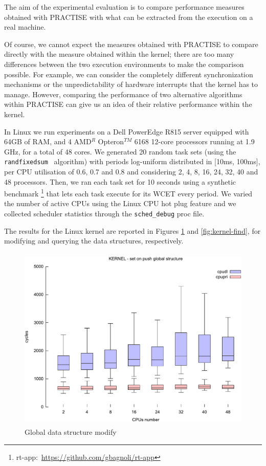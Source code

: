 The aim of the experimental evaluation is to compare performance measures obtained with
PRACTISE with what can be extracted from the execution on a real machine.

Of course, we cannot expect the measures obtained with PRACTISE to compare directly with the
measure obtained within the kernel; there are too many differences between the two execution
environments to make the comparison possible. For example, we can consider the completely different
synchronization mechanisms or the unpredictability of hardware interrupts that the kernel
has to manage. However, comparing the performance of two alternative algorithms
within PRACTISE can give us an idea of their relative performance within the kernel.

In Linux we run experiments on a Dell PowerEdge R815 server equipped with 64GB of RAM, and
4 AMD$^{R}$ Opteron$^{TM}$ 6168 12-core processors running at 1.9 GHz, for a total of 48 cores.
We generated 20 random task sets (using the \texttt{randfixedsum}~\cite{Emberson10-WATERS} algorithm) with
periods log-uniform distributed in [10ms, 100ms], per CPU utilisation of 0.6, 0.7 and 0.8
and considering 2, 4, 8, 16, 24, 32, 40 and 48 processors. Then, we ran each task set for 10
seconds using a synthetic benchmark \footnote{rt-app:~\url{https://github.com/gbagnoli/rt-app}}
that lets each task execute for its WCET every period. We varied the number of active CPUs
using the Linux CPU hot plug feature and we collected scheduler statistics through 
the \texttt{sched\_debug} proc file.

The results for the Linux kernel are reported in Figures \ref{fig:kernel-set} and
\ref{fig:kernel-find}, for modifying and querying the data structures, respectively.

\begin{figure}[htbp]
	\centering
	\includegraphics[height=3.5in, keepaspectratio]{images/kernel_set.pdf}
	\caption{Global data structure modify}
	\label{fig:kernel-set}
\end{figure}

